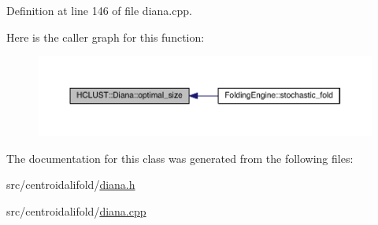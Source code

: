 Definition at line 146 of file diana.\+cpp.



Here is the caller graph for this function\+:
\nopagebreak
\begin{figure}[H]
\begin{center}
\leavevmode
\includegraphics[width=350pt]{class_h_c_l_u_s_t_1_1_diana_aed9c1e18a682886ca439cd8fff2bd8fe_icgraph}
\end{center}
\end{figure}




The documentation for this class was generated from the following files\+:\begin{DoxyCompactItemize}
\item 
src/centroidalifold/\hyperlink{diana_8h}{diana.\+h}\item 
src/centroidalifold/\hyperlink{diana_8cpp}{diana.\+cpp}\end{DoxyCompactItemize}
